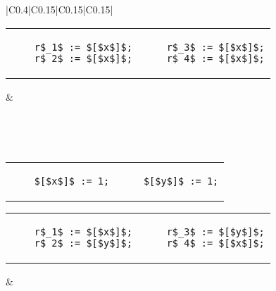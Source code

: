 \begin{table}
\begin{tabular}{|C{0.4\textwidth}|C{0.15\textwidth}|C{0.15\textwidth}|C{0.15\textwidth}|}
    \begin{tabular}{@{\hskip -15pt}l|@{\hskip 5pt}|@{\hskip -15pt}l}
    \begin{lstlisting}
    r$_1$ := $[$x$]$;
    r$_2$ := $[$x$]$;
    \end{lstlisting}
    &
    \begin{lstlisting}
    r$_3$ := $[$x$]$;
    r$_4$ := $[$x$]$;
    \end{lstlisting}
    \end{tabular}
    
    & 
    
    
    \\ \hline
    
      \\ \hline
    
    \begin{tabular}{@{\hskip -15pt}l|@{\hskip 5pt}|@{\hskip -15pt}l}
    \begin{lstlisting}
    $[$x$]$ := 1;
    \end{lstlisting}
    &
    \begin{lstlisting}
    $[$y$]$ := 1;
    \end{lstlisting}
    \end{tabular}
    
    \vspace{5pt}
    
    \begin{tabular}{@{\hskip -15pt}l|@{\hskip 5pt}|@{\hskip -15pt}l}
    \begin{lstlisting}
    r$_1$ := $[$x$]$;
    r$_2$ := $[$y$]$;
    \end{lstlisting}
    &
    \begin{lstlisting}
    r$_3$ := $[$y$]$;
    r$_4$ := $[$x$]$;
    \end{lstlisting}
    \end{tabular}
    
    &
    
    

\end{tabular}
\end{table}
